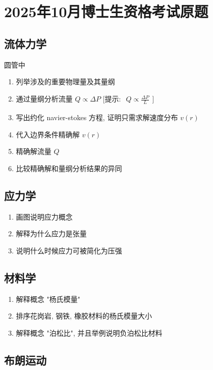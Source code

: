 \documentclass[../../main.tex]{subfiles}
\begin{document}
\section{2025年10月博士生资格考试原题}

\subsection{流体力学}
圆管中

\begin{enumerate}
    \item 列举涉及的重要物理量及其量纲
    \item 通过量纲分析流量 $Q\propto \Delta P$ [提示: $\begin{aligned}Q\propto \frac{\Delta P}{L}\end{aligned}$]
    \item 写出约化 navier-stokes 方程, 证明只需求解速度分布 $v(r)$
    \item 代入边界条件精确解 $v(r)$
    \item 精确解流量 $Q$
    \item 比较精确解和量纲分析结果的异同
\end{enumerate}

\subsection{应力学}

\begin{enumerate}
    \item 画图说明应力概念
    \item 解释为什么应力是张量
    \item 说明什么时候应力可被简化为压强
\end{enumerate}

\subsection{材料学}

\begin{enumerate}
    \item 解释概念 "杨氏模量"
    \item 排序花岗岩, 钢铁, 橡胶材料的杨氏模量大小
    \item 解释概念 "泊松比", 并且举例说明负泊松比材料
\end{enumerate}

\subsection{布朗运动}
\end{document}
